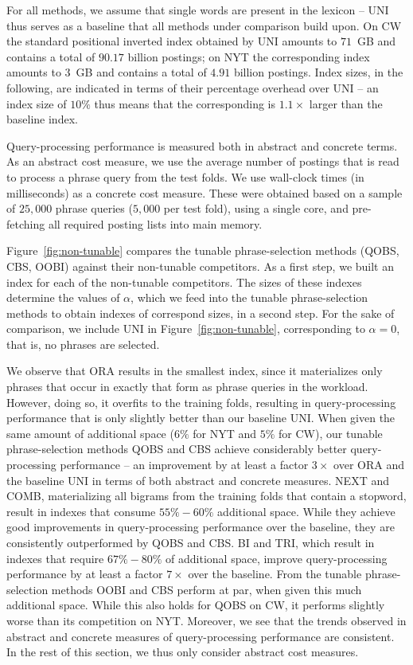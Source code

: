 For all methods, we assume that single words are present in the
lexicon -- UNI thus serves as a baseline that all methods under
comparison build upon. On CW the standard positional inverted index
obtained by UNI amounts to $71$~GB and contains a total of $90.17$
billion postings; on NYT the corresponding index amounts to $3$~GB and
contains a total of $4.91$ billion postings. Index sizes, in the
following, are indicated in terms of their percentage overhead over
UNI -- an index size of $10\%$ thus means that the corresponding is
$1.1\times$ larger than the baseline index.

Query-processing performance is measured both in abstract and concrete
terms. As an abstract cost measure, we use the average number of
postings that is read to process a phrase query from the test
folds. We use wall-clock times (in milliseconds) as a concrete cost
measure. These were obtained based on a sample of $25,000$ phrase
queries ($5,000$ per test fold), using a single core, and pre-fetching
all required posting lists into main memory. 

Figure~\ref{fig:non-tunable} compares the tunable phrase-selection
methods (QOBS, CBS, OOBI) against their non-tunable competitors. As a
first step, we built an index for each of the non-tunable
competitors. The sizes of these indexes determine the values of
$\alpha$, which we feed into the tunable phrase-selection methods to
obtain indexes of correspond sizes, in a second step. For the sake of
comparison, we include UNI in Figure~\ref{fig:non-tunable},
corresponding to $\alpha = 0$, that is, no phrases are selected.

We observe that ORA results in the smallest index, since it
materializes only phrases that occur in exactly that form as phrase
queries in the workload. However, doing so, it overfits to the
training folds, resulting in query-processing performance that is only
slightly better than our baseline UNI. When given the same amount of
additional space ($6\%$ for NYT and $5\%$ for CW), our tunable
phrase-selection methods QOBS and CBS achieve considerably better
query-processing performance -- an improvement by at least a factor
$3\times$ over ORA and the baseline UNI in terms of both abstract and
concrete measures. NEXT and COMB, materializing all bigrams from the
training folds that contain a stopword, result in indexes that consume
$55\%-60\%$ additional space. While they achieve good improvements in
query-processing performance over the baseline, they are consistently
outperformed by QOBS and CBS. BI and TRI, which result in indexes that
require $67\%-80\%$ of additional space, improve query-processing
performance by at least a factor $7\times$ over the baseline. From the
tunable phrase-selection methods OOBI and CBS perform at par, when
given this much additional space. While this also holds for QOBS on
CW, it performs slightly worse than its competition on NYT. Moreover,
we see that the trends observed in abstract and concrete measures of
query-processing performance are consistent. In the rest of this
section, we thus only consider abstract cost measures.

